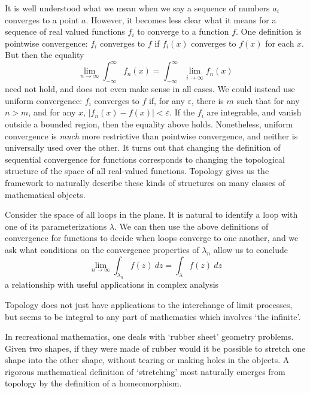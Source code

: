 \begin{example}
    It is well understood what we mean when we say a sequence of numbers $a_i$ converges to a point $a$. However, it becomes less clear what it means for a sequence of real valued functions $f_i$ to converge to a function $f$. One definition is pointwise convergence: $f_i$ converges to $f$ if $f_i(x)$ converges to $f(x)$ for each $x$. But then the equality
    \[ \lim_{n \to \infty} \int_{-\infty}^\infty f_n(x) = \int_{-\infty}^\infty \lim_{i \to \infty} f_n(x) \]
    need not hold, and does not even make sense in all cases. We could instead use uniform convergence: $f_i$ converges to $f$ if, for any $\varepsilon$, there is $m$ such that for any $n > m$, and for any $x$, $|f_n(x) - f(x)| < \varepsilon$. If the $f_i$ are integrable, and vanish outside a bounded region, then the equality above holds. Nonetheless, uniform convergence is {\it much} more restrictive than pointwise convergence, and neither is universally used over the other. It turns out that changing the definition of sequential convergence for functions corresponds to changing the topological structure of the space of all real-valued functions. Topology gives us the framework to naturally describe these kinds of structures on many classes of mathematical objects.
\end{example}

\begin{example}
    Consider the space of all loops in the plane. It is natural to identify a loop with one of its parameterizations $\lambda$. We can then use the above definitions of convergence for functions to decide when loops converge to one another, and we ask what conditions on the convergence properties of $\lambda_n$ allow us to conclude
    \[ \lim_{n \to \infty} \int_{\lambda_n} f(z)\ dz = \int_{\lambda} f(z)\ dz \]
    a relationship with useful applications in complex analysis
\end{example}

Topology does not just have applications to the interchange of limit processes, but seems to be integral to any part of mathematics which involves `the infinite'.

\begin{example}
    In recreational mathematics, one deals with `rubber sheet' geometry problems. Given two shapes, if they were made of rubber would it be possible to stretch one shape into the other shape, without tearing or making holes in the objects. A rigorous mathematical definition of `stretching' most naturally emerges from topology by the definition of a homeomorphism.
\end{example}

